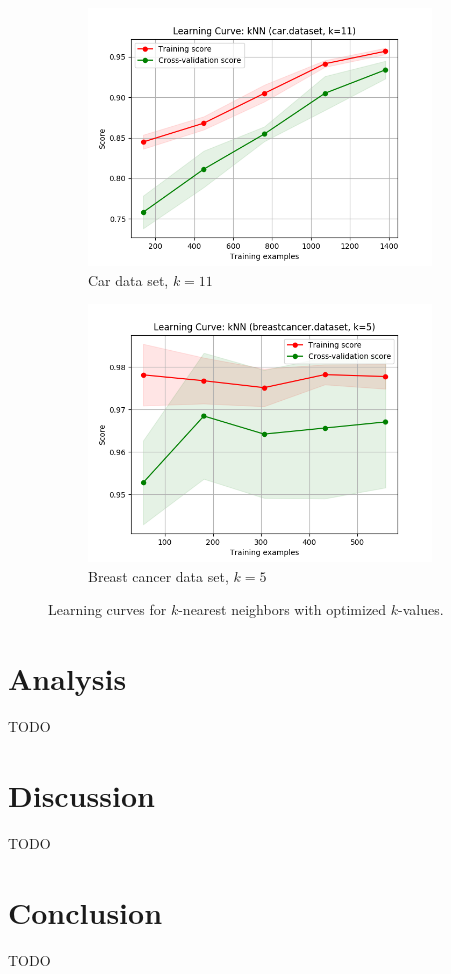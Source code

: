\documentclass{article}
\begin{document}
    \begin{figure}[htb]
    \centering

    \begin{subfigure}{0.5\textwidth}
      \includegraphics[width=\linewidth]{out/knn/car-k-11.png}
      \caption{Car data set, $k=11$}
      \label{fig:knn-learning-1}
    \end{subfigure}\hfil
    \begin{subfigure}{0.5\textwidth}
      \includegraphics[width=\linewidth]{out/knn/breastcancer-k-5.png}
      \caption{Breast cancer data set, $k=5$}
      \label{fig:knn-learning-2}
    \end{subfigure}

    \caption{Learning curves for $k$-nearest neighbors with optimized $k$-values.}
    \label{fig:knn-learning}
    \end{figure}

    \section{Analysis}
    TODO

    \section{Discussion}
    TODO

    \section{Conclusion}
    TODO
\end{document}
